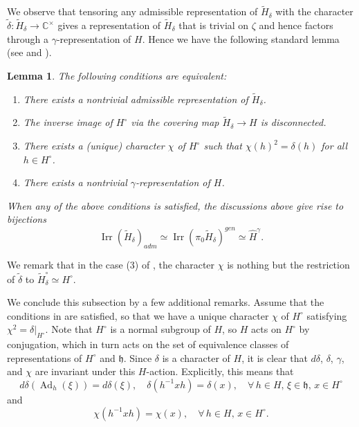 \documentclass[11pt, a4paper]{amsart}
\newcommand{\C}{\mathbb{C}}
\newcommand{\fh}{\mathfrak{h}}
\DeclareMathOperator{\Ad}{Ad}
\newcommand{\cm}{\C^\times}
\newcommand{\Irr}{\operatorname{Irr}}
\newtheorem{Lem}[Thm]{Lemma}
\theoremstyle{definition}
\numberwithin{equation}{section}
\begin{document}
We observe that tensoring any admissible representation of $\widetilde{H}_\delta$ with the character $\tilde{\delta}: \widetilde{H}_\delta \to \cm$ gives a representation of $\widetilde{H}_\delta$ that is trivial on $\zeta$ and hence factors through a $\gamma$-representation of $H$. Hence we have the following standard lemma (see \cite{Schwartz} and \cite[\S\,1, Proposition and Remark 4]{Ohta:Adm}).

\begin{Lem} \label{lem:adm_repn}
	The following conditions are equivalent:
	\begin{enumerate}
		\item 
		There exists a nontrivial admissible representation of $\widetilde{H}_\delta$.
		\item 
		The inverse image of $H^\circ$ via the covering map $\widetilde{H}_\delta \to H$ is disconnected.
		\item 
		There exists a (unique) character $\chi$ of $H^\circ$ such that $\chi(h)^2 = \delta(h)$ for all $h \in H^\circ$.
		\item 
		There exists a nontrivial $\gamma$-representation of $H$.
	\end{enumerate}
	When any of the above conditions is satisfied, the discussions above give rise to bijections 
	\begin{equation} \label{eq:bij_gamma_adm}
		\Irr(\widetilde{H}_\delta)_{adm} \simeq \Irr(\pi_0 \widetilde{H}_\delta)^{gen} \simeq \widehat{H}^\gamma.
	\end{equation}
\end{Lem}

We remark that in the case (3) of , the character $\chi$ is nothing but the restriction of $\tilde{\delta}$ to $\widetilde{H}_\delta^\circ \simeq H^\circ$.

We conclude this subsection by a few additional remarks. Assume that the conditions in  are satisfied, so that we have a unique character $\chi$ of $H^\circ$ satisfying $\chi^2 = \delta|_{H^\circ}$. Note that $H^\circ$ is a normal subgroup of $H$, so $H$ acts on $H^\circ$ by conjugation, which in turn acts on the set of equivalence classes of representations of $H^\circ$ and $\fh$. Since $\delta$ is a character of $H$, it is clear that $d \delta$, $\delta$, $\gamma$, and $\chi$ are invariant under this $H$-action. Explicitly, this means that
\begin{equation}\label{eq:delta_inv}
	d\delta(\Ad_h(\xi)) = d\delta(\xi), \quad \delta(h^{-1} x h) = \delta(x), \quad \forall \, h \in H, \, \xi \in \fh, \, x \in H^\circ
\end{equation}
and
\begin{equation}\label{eq:chi_inv}
	\chi(h^{-1} x h) = \chi(x), \quad \forall \, h \in H, \, x \in H^\circ.
\end{equation}
\end{document}

